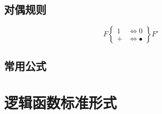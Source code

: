 \subsection{对偶规则}

\begin{equation}
    F\left\{
    \begin{aligned}
        1 & \Longleftrightarrow 0       \\
        + & \Longleftrightarrow \bullet
    \end{aligned}
    \right\} F'
\end{equation}

\subsection{常用公式}

\newpage

\section{逻辑函数标准形式}

